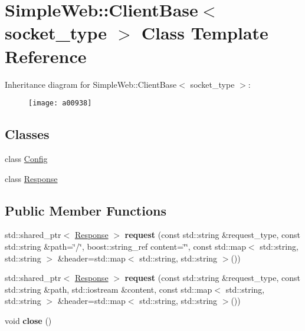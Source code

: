 \hypertarget{a00938}{}\section{Simple\+Web\+:\+:Client\+Base$<$ socket\+\_\+type $>$ Class Template Reference}
\label{a00938}
Inheritance diagram for Simple\+Web\+:\+:Client\+Base$<$ socket\+\_\+type $>$\+:\begin{figure}[H]
\begin{center}
\leavevmode
\texttt{[image: a00938]}
\end{center}
\end{figure}
\subsection*{Classes}
\begin{DoxyCompactItemize}
\item 
class \hyperlink{a00946}{Config}
\item 
class \hyperlink{a00942}{Response}
\end{DoxyCompactItemize}
\subsection*{Public Member Functions}
\begin{DoxyCompactItemize}
\item 
\mbox{\label{a00938_ac8a838ace77f0a1a19b8cb03bdba7e74}} 
std\+::shared\+\_\+ptr$<$ \hyperlink{a00942}{Response} $>$ {\bfseries request} (const std\+::string \&request\+\_\+type, const std\+::string \&path=\char`\"{}/\char`\"{}, boost\+::string\+\_\+ref content=\char`\"{}\char`\"{}, const std\+::map$<$ std\+::string, std\+::string $>$ \&header=std\+::map$<$ std\+::string, std\+::string $>$())
\item 
\mbox{\label{a00938_aca6cb17dbea9adf0cf1daf9d1ea70f76}} 
std\+::shared\+\_\+ptr$<$ \hyperlink{a00942}{Response} $>$ {\bfseries request} (const std\+::string \&request\+\_\+type, const std\+::string \&path, std\+::iostream \&content, const std\+::map$<$ std\+::string, std\+::string $>$ \&header=std\+::map$<$ std\+::string, std\+::string $>$())
\item 
\mbox{\label{a00938_ad21735a9bda2fae6aedd811efae981e1}} 
void {\bfseries close} ()
\end{DoxyCompactItemize}
